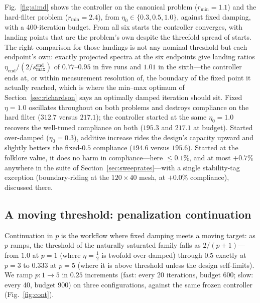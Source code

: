 \documentclass[11pt,a4paper]{article}
\newcommand{\smax}{s_{\max}}
\begin{document}
Fig.~\ref{fig:aimd} shows the controller on the canonical problem
($r_{\min}=1.1$) and the hard-filter problem ($r_{\min}=2.4$), from
$\eta_0\in\{0.3,0.5,1.0\}$, against fixed damping, with a
400-iteration budget. From all six starts the controller converges, with landing points that
are the problem's own despite the threefold spread of starts. The right
comparison for those landings is not any nominal threshold but each
endpoint's own: exactly projected spectra at the six endpoints give
landing ratios $\eta_{\mathrm{end}}/(2/\smax^{\mathrm{end}})$ of
$0.77$--$0.95$ in five runs and $1.01$ in the sixth---the controller
ends at, or within measurement resolution of, the boundary of the
fixed point it actually reached, which is where the min--max optimum of
Section~\ref{sec:richardson} says an optimally damped iteration should
sit. Fixed
$\eta=1.0$ oscillates throughout on both problems and destroys
compliance on the hard filter ($312.7$ versus $217.1$); the controller
started at the same $\eta_0=1.0$ recovers the well-tuned compliance on
both ($195.3$ and $217.1$ at budget). Started over-damped
($\eta_0=0.3$), additive increase rides the design's capacity upward and
slightly betters the fixed-$0.5$ compliance ($194.6$ versus $195.6$).
Started at the folklore value, it does no harm in compliance---here
$\le0.1\%$, and at most $+0.7\%$ anywhere in the suite of
Section~\ref{sec:sweeprates}---with a single stability-tag exception
(boundary-riding at the $120\times40$ mesh, at $+0.0\%$ compliance),
discussed there.

\subsection{A moving threshold: penalization continuation}
\label{sec:continuation}

Continuation in $p$ is the workflow where fixed damping meets a moving
target: as $p$ ramps, the threshold of the naturally saturated family
falls as $2/(p{+}1)$---from $1.0$ at $p=1$ (where $\eta=\tfrac12$ is
twofold over-damped) through $0.5$ exactly at $p=3$ to $0.333$ at $p=5$
(where it is above threshold unless the design self-limits). We ramp
$p:1\to5$ in $0.25$ increments (fast: every 20 iterations, budget 600;
slow: every 40, budget 900) on three configurations, against the same
frozen controller (Fig.~\ref{fig:cont}).
\end{document}
